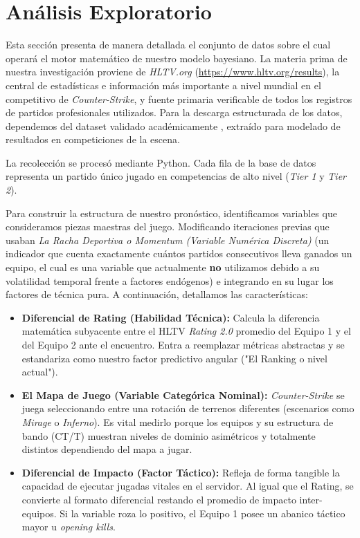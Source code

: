 \documentclass[twocolumn,10pt]{article}
\begin{document}
\section{Análisis Exploratorio}
Esta sección presenta de manera detallada el conjunto de datos sobre el cual operará el motor matemático de nuestro modelo bayesiano. La materia prima de nuestra investigación proviene de 
\textit{HLTV.org} (\url{https://www.hltv.org/results}), 
la central de estadísticas e información más importante 
a nivel mundial en el competitivo de \textit{Counter-Strike}, 
y fuente primaria verificable de todos los registros de 
partidos profesionales utilizados. Para la descarga 
estructurada de los datos, dependemos del dataset validado académicamente \citep{csgodataset2020}, extraído para modelado de resultados en competiciones de la escena.

La recolección se procesó mediante Python. Cada fila de la base de datos representa un partido único jugado en competencias de alto nivel (\textit{Tier 1} y \textit{Tier 2}).

Para construir la estructura de nuestro pronóstico, identificamos variables que consideramos piezas maestras del juego. Modificando iteraciones previas que usaban \textit{La Racha Deportiva o Momentum (Variable Numérica Discreta)} (un indicador que cuenta exactamente cuántos partidos consecutivos lleva ganados un equipo, el cual es una variable que actualmente \textbf{no} utilizamos debido a su volatilidad temporal frente a factores endógenos) e integrando en su lugar los factores de técnica pura. A continuación, detallamos las características:
\begin{itemize}
    \item \textbf{Diferencial de Rating (Habilidad Técnica):} Calcula la diferencia matemática subyacente entre el HLTV \textit{Rating 2.0} promedio del Equipo 1 y el del Equipo 2 ante el encuentro. Entra a reemplazar métricas abstractas y se estandariza como nuestro factor predictivo angular ("El Ranking o nivel actual").
    \item \textbf{El Mapa de Juego (Variable Categórica Nominal):} \textit{Counter-Strike} se juega seleccionando entre una rotación de terrenos diferentes (escenarios como \textit{Mirage} o \textit{Inferno}). Es vital medirlo porque los equipos y su estructura de bando (CT/T) muestran niveles de dominio asimétricos y totalmente distintos dependiendo del mapa a jugar.
    \item \textbf{Diferencial de Impacto (Factor Táctico):} Refleja de forma tangible la capacidad de ejecutar jugadas vitales en el servidor. Al igual que el Rating, se convierte al formato diferencial restando el promedio de impacto inter-equipos. Si la variable roza lo positivo, el Equipo 1 posee un abanico táctico mayor u \textit{opening kills}.
\end{itemize}
\end{document}
